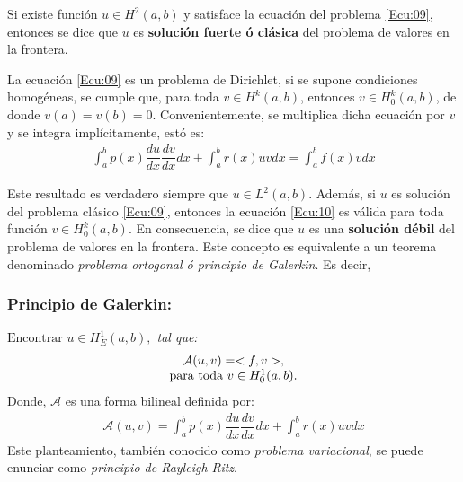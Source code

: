 \documentclass[12pt]{article}
\begin{document}
Si existe función $u \in H^2(a,b)$ y satisface la ecuación del problema \eqref{Ecu:09}, entonces se dice que $\textit{u}$ es \textbf{solución fuerte ó clásica} del problema de valores en la frontera.

La ecuación \eqref{Ecu:09} es un problema de Dirichlet, si se supone condiciones homogéneas, se cumple que, para toda $v \in H^k(a,b)$, entonces $v \in H^k_0(a,b)$, de donde $v(a)=v(b)=0$. Convenientemente, se multiplica dicha ecuación por $\textit{v}$ y se integra implícitamente, estó es:
\begin{equation} 
\begin{array}{c}
\int_{a}^{b}p(x)\dfrac{du}{dx}\dfrac{dv}{dx}dx + \int_{a}^{b}r(x)uvdx = \int_{a}^{b}f(x)vdx
\label{Ecu:10}
\end{array} 
\end{equation}

Este resultado es verdadero siempre que $u \in L^2(a,b)$. Además, si $\textit{u}$ es solución del problema clásico \eqref{Ecu:09}, entonces la ecuación \eqref{Ecu:10} es válida para toda función $v \in H^k_0(a,b)$. En consecuencia, se dice que $ \textit{u} $ es una \textbf{solución débil} del problema de valores en la frontera. Este concepto es equivalente a un teorema denominado {\em problema ortogonal ó principio de Galerkin}. Es decir,

\subsubsection{\bf Principio de Galerkin:} {\em 
$\textrm{Encontrar }u\in H^1_E(a,b),$\textrm{ tal que: }
\begin{equation}
\begin{array}{c}
\mathcal{A}(u,v)=<f,v>,\\
$para toda $ v \in H^1_0(a,b).
\label{Ecu:11}
\end{array}
\end{equation}}
Donde, $\mathcal{A}$ es una forma bilineal definida por:
\begin{equation} 
\begin{array}{c}
\mathcal{A}(u,v) = \int_{a}^{b}p(x)\dfrac{du}{dx}\dfrac{dv}{dx}dx + \int_{a}^{b}r(x)uvdx 
\label{Ecu:12}
\end{array} 
\end{equation} 
Este planteamiento, también conocido como \textit{problema variacional}, se puede enunciar como {\em principio de Rayleigh-Ritz}.
\end{document}
